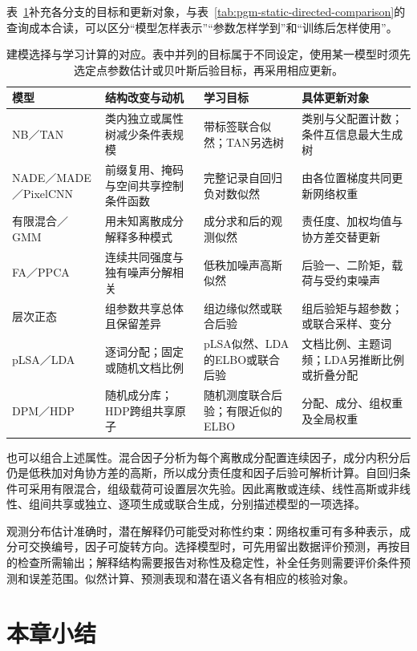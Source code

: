 表~\ref{tab:pgm-static-directed-learning-map}补充各分支的目标和更新对象，与表~\ref{tab:pgm-static-directed-comparison}的查询成本合读，可以区分“模型怎样表示”“参数怎样学到”和“训练后怎样使用”。
\begin{table}[htbp]
 \centering\small
 \begin{tabularx}{\linewidth}{@{}p{25mm}XXX@{}}
 \toprule
 模型 & 结构改变与动机 & 学习目标 & 具体更新对象\\
 \midrule
 NB／TAN & 类内独立或属性树减少条件表规模 & 带标签联合似然；TAN另选树 & 类别与父配置计数；条件互信息最大生成树\\
 NADE／MADE／PixelCNN & 前缀复用、掩码与空间共享控制条件函数 & 完整记录自回归负对数似然 & 由各位置梯度共同更新网络权重\\
 有限混合／GMM & 用未知离散成分解释多种模式 & 成分求和后的观测似然 & 责任度、加权均值与协方差交替更新\\
 FA／PPCA & 连续共同强度与独有噪声分解相关 & 低秩加噪声高斯似然 & 后验一、二阶矩，载荷与受约束噪声\\
 层次正态 & 组参数共享总体且保留差异 & 组边缘似然或联合后验 & 组后验矩与超参数；或联合采样、变分\\
 pLSA／LDA & 逐词分配；固定或随机文档比例 & pLSA似然、LDA的ELBO或联合后验 & 文档比例、主题词频；LDA另推断比例或折叠分配\\
 DPM／HDP & 随机成分库；HDP跨组共享原子 & 随机测度联合后验；有限近似的ELBO & 分配、成分、组权重及全局权重\\
 \bottomrule
 \end{tabularx}
 \caption{建模选择与学习计算的对应。表中并列的目标属于不同设定，使用某一模型时须先选定点参数估计或贝叶斯后验目标，再采用相应更新。}
 \label{tab:pgm-static-directed-learning-map}
\end{table}

也可以组合上述属性。混合因子分析为每个离散成分配置连续因子，成分内积分后仍是低秩加对角协方差的高斯，所以成分责任度和因子后验可解析计算。自回归条件可采用有限混合，组级载荷可设置层次先验。因此离散或连续、线性高斯或非线性、组间共享或独立、逐项生成或联合生成，分别描述模型的一项选择。

观测分布估计准确时，潜在解释仍可能受对称性约束：网络权重可有多种表示，成分可交换编号，因子可旋转方向。选择模型时，可先用留出数据评价预测，再按目的检查所需输出；解释结构需要报告对称性及稳定性，补全任务则需要评价条件预测和误差范围。似然计算、预测表现和潜在语义各有相应的核验对象。

\section{本章小结}
\label{sec:pgm-static-directed-summary}

